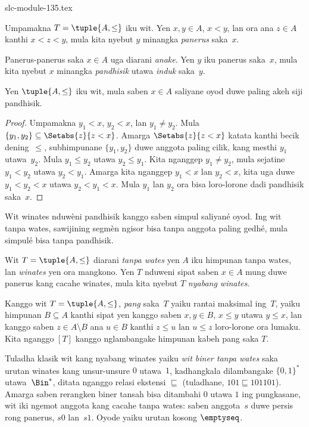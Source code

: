\begin{filecontents*}[overwrite]{slc-module-135.tex}
\begin{defn}[Panerus]
Umpamakna $T = \tuple{A, \le}$ iku wit.
Yen $x,y \in A$, $x < y$, lan ora ana
$z \in A$ kanthi $x < z < y$,
mula kita nyebut $y$ minangka \emph{panerus} saka~$x$.
\end{defn}

Panerus-panerus saka $x \in A$ uga diarani \emph{anake}.
Yen $y$ iku panerus saka~$x$, mula kita nyebut $x$
minangka \emph{pandhisik} utawa \emph{induk} saka~$y$.

\begin{prop}
Yen $\tuple{A,\le}$ iku wit, mula saben $x \in A$
saliyane oyod duwe paling akeh siji pandhisik.
\end{prop}

\begin{proof}
  Umpamakna $y_1 < x$, $y_2 < x$, lan $y_1 \neq y_2$.
  Mula $\{y_1,y_2\} \subseteq \Setabs{z}{z<x}$.
  Amarga $\Setabs{z}{z<x}$ katata kanthi becik
  dening~$\le$, subhimpunane $\{y_1, y_2\}$
  duwe anggota paling cilik, kang mesthi
  $y_1$ utawa~$y_2$.
  Mula $y_1 \le y_2$ utawa $y_2 \le y_1$.
  Kita nganggep $y_1 \neq y_2$, mula sejatine
  $y_1 < y_2$ utawa $y_2 < y_1$.
  Amarga kita nganggep $y_1 < x$ lan $y_2 < x$,
  kita uga duwe $y_1 < y_2< x$ utawa
  $y_2 < y_1 < x$.
  Mula $y_1$ lan $y_2$ ora bisa loro-lorone
  dadi pandhisik saka~$x$.
\end{proof}
Wit winates nduwèni pandhisik kanggo saben simpul saliyané oyod.
Ing wit tanpa wates, sawijining segmèn ngisor bisa tanpa
anggota paling gedhé, mula simpulé bisa tanpa pandhisik.

\begin{defn}
Wit $T = \tuple{A, \le}$ diarani \emph{tanpa wates}
yen $A$ iku himpunan tanpa wates, lan
\emph{winates} yen ora mangkono.
Yen $T$ nduweni sipat saben $x \in A$
mung duwe panerus kang cacahe winates,
mula kita nyebut $T$ \emph{nyabang winates}.
\end{defn}

\begin{defn}[Pang]
Kanggo wit $T = \tuple{A, \le}$, \emph{pang} saka~$T$
yaiku rantai maksimal ing~$T$, yaiku himpunan
$B \subseteq A$ kanthi sipat yen kanggo saben
$x, y \in B$, $x \le y$ utawa $y \le x$,
lan kanggo saben $z \in A \setminus B$
ana $u \in B$ kanthi $z \le u$ lan $u \le z$
loro-lorone ora lumaku.
%
Kita nganggo $[T]$ kanggo nglambangake
himpunan kabeh pang saka $T$.
\end{defn}

\begin{ex}
Tuladha klasik wit kang nyabang winates yaiku
\emph{wit biner tanpa wates} saka urutan winates
kang unsur-unsure $0$ utawa~$1$, kadhangkala
dilambangake $\{0,1\}^*$ utawa~$\Bin^*$,
ditata nganggo relasi ekstensi $\sqsubseteq$
(tuladhane, $101 \sqsubseteq 101101$).
Amarga saben rerangken biner tansah bisa
ditambahi $0$ utawa $1$ ing pungkasane,
wit iki ngemot anggota kang cacahe tanpa wates:
saben anggota~$s$ duwe persis rong panerus,
$s0$ lan~$s1$.
Oyode yaiku urutan kosong $\emptyseq$.
\end{ex}


\end{filecontents*}
